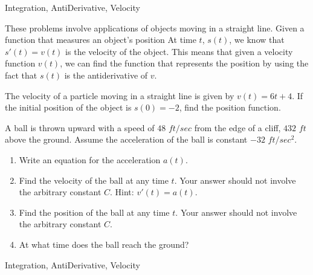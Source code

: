 \begin{tagblock}{Integration, AntiDerivative, Velocity}
\begin{question}

These problems involve applications of objects moving in a straight line. Given a function that measures an object's position At time $t$, $s(t)$, we know that $s'(t) = v(t)$ is the velocity of the object. This means that given a velocity function $v(t)$, we can find the function that represents the position by using the fact that $s(t)$ is the antiderivative of $v$. 

\bigskip

The velocity of a particle moving in a straight line is given by $v(t)= 6 t +4$. If the initial position of the object is $s(0)=-2$, find the position function.
\vspace{1in}

\item A ball is thrown upward with a speed of $48$  $ft/sec$ from the edge of a cliff, $432$ $ft$ above the ground. Assume the acceleration of the ball is constant $-32$ $ft/sec^2$.
\begin{enumerate}
\item Write an equation for the acceleration $a(t)$.
\vspace{.5in}
\item Find the velocity of the ball at any time $t$. Your answer should not involve the arbitrary constant $C$. Hint: $v'(t) = a(t)$.
\vspace{1in}
\item Find the position of the ball at any time $t$. Your answer should not involve the arbitrary constant $C$.
\vspace{1in}

\item At what time does the ball reach the ground?
\end{enumerate}


	
	
\begin{tags}
	    Integration, AntiDerivative, Velocity
\end{tags}
	
\begin{diary}
	   
\end{diary}
	
\begin{solution}
	   
	    \end{enumerate}
\end{solution}
	
\end{question}

\end{tagblock}

